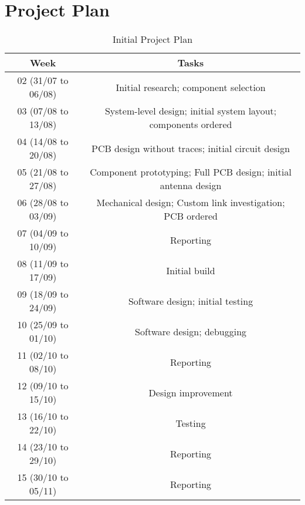
\chapter{Project Plan}

\begin{table}[!htb]
  \centering
  \renewcommand{\arraystretch}{1.2}
  \begin{tabular}{ |c|c| }
  \hline
  \textbf{Week}        & \textbf{Tasks}    \\
  \hline
  02 (31/07 to 06/08) & Initial research; component selection \\ \hline
  03 (07/08 to 13/08) & System-level design; initial system layout; components ordered \\ \hline
  04 (14/08 to 20/08) & PCB design without traces; initial circuit design \\ \hline
  05 (21/08 to 27/08) & Component prototyping; Full PCB design; initial antenna design \\ \hline
  06 (28/08 to 03/09) & Mechanical design; Custom link investigation; PCB ordered \\ \hline
  07 (04/09 to 10/09) & Reporting \\ \hline
  08 (11/09 to 17/09) & Initial build \\ \hline
  09 (18/09 to 24/09) & Software design; initial testing \\ \hline
  10 (25/09 to 01/10) & Software design; debugging \\ \hline
  11 (02/10 to 08/10) & Reporting \\ \hline
  12 (09/10 to 15/10) & Design improvement \\ \hline
  13 (16/10 to 22/10) & Testing \\ \hline
  14 (23/10 to 29/10) & Reporting \\ \hline
  15 (30/10 to 05/11) & Reporting \\ \hline
  \end{tabular}
  \caption{Initial Project Plan}
  \label{tab:projectPlan}
\end{table}
